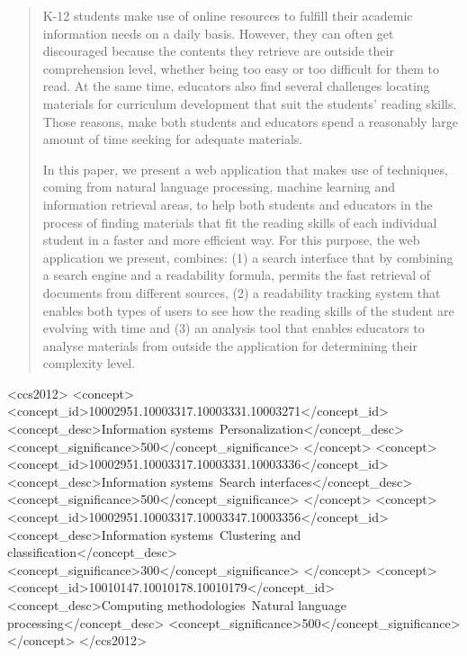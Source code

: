 \documentclass{sig-alternate-05-2015}
\begin{document}
\maketitle
\begin{abstract}


K-12 students make use of online resources to fulfill their academic information needs on a daily basis. However, they can often get discouraged because the contents they retrieve are outside their comprehension level, whether being too easy or too difficult  for them to read. At the same time, educators also find several challenges locating materials for curriculum development that suit the students' reading skills. Those reasons, make both students and educators spend a reasonably large  amount of time seeking for adequate materials.

 In this paper, we present a web application that makes use of techniques, coming from natural language processing, machine learning and information retrieval areas, to help both students and educators in the process of finding materials that fit the reading skills of each individual student in a faster and more efficient way. For this purpose, the web application we present, combines: (1) a search interface that by combining a search engine and a readability formula, permits the fast retrieval of documents from different sources, (2)  a readability tracking system that enables both types of users to see how the reading skills of the student are evolving with time and (3) an analysis tool that enables educators to analyse materials from outside the application for determining their complexity level.






\end{abstract}


%
%



 \begin{CCSXML}
<ccs2012>
<concept>
<concept_id>10002951.10003317.10003331.10003271</concept_id>
<concept_desc>Information systems~Personalization</concept_desc>
<concept_significance>500</concept_significance>
</concept>
<concept>
<concept_id>10002951.10003317.10003331.10003336</concept_id>
<concept_desc>Information systems~Search interfaces</concept_desc>
<concept_significance>500</concept_significance>
</concept>
<concept>
<concept_id>10002951.10003317.10003347.10003356</concept_id>
<concept_desc>Information systems~Clustering and classification</concept_desc>
<concept_significance>300</concept_significance>
</concept>
<concept>
<concept_id>10010147.10010178.10010179</concept_id>
<concept_desc>Computing methodologies~Natural language processing</concept_desc>
<concept_significance>500</concept_significance>
</concept>
</ccs2012>
\end{CCSXML}
\end{document}
